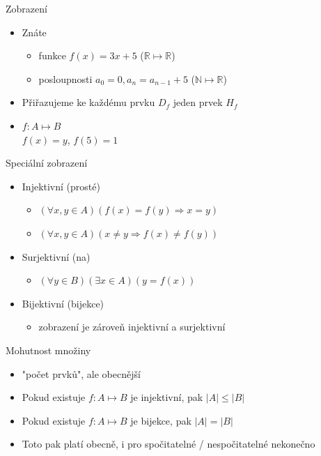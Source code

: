 \documentclass[aspectratio=1610]{beamer}
\begin{document}
\begin{frame}{Zobrazení}

\begin{itemize}
  \item Znáte \begin{itemize}
    \item funkce $f(x) = 3x + 5$ ($\mathbb{R} \mapsto \mathbb{R}$)
    \item posloupnosti $a_0 = 0, a_n = a_{n - 1} + 5$ ($\mathbb{N} \mapsto \mathbb{R}$)
  \end{itemize}
  \item Přiřazujeme ke každému prvku \textbf{$D_f$} jeden prvek \textbf{$H_f$}
  \item $f: A \mapsto B$ \\
    $f(x) = y$, $f(5) = 1$
\end{itemize}

\end{frame}

\begin{frame}{Speciální zobrazení}

\begin{itemize}
  \item Injektivní (prosté) \begin{itemize}
    \item<2-> $(\forall x,y \in A)(f(x) = f(y) \Rightarrow x = y)$
    \item<2-> $(\forall x,y \in A)(x \neq y\Rightarrow f(x) \neq f(y) )$
  \end{itemize}
  \item Surjektivní (na) \begin{itemize}
    \item<3-> $(\forall y \in B)(\exists x \in A)(y = f(x))$
  \end{itemize}
  \item Bijektivní (bijekce) \begin{itemize}
    \item<4-> zobrazení je zároveň injektivní a surjektivní
  \end{itemize}

\end{itemize}

\end{frame}

\begin{frame}{Mohutnost množiny}

\begin{itemize}
  \item "počet prvků", ale obecnější
  \item Pokud existuje $f: A \mapsto B$ je injektivní, pak $|A| \leq |B|$
  \item Pokud existuje $f: A \mapsto B$ je bijekce, pak $|A| = |B|$
  \item Toto pak platí obecně, i pro spočitatelné / nespočitatelné nekonečno
\end{itemize}

\end{frame}
\end{document}
